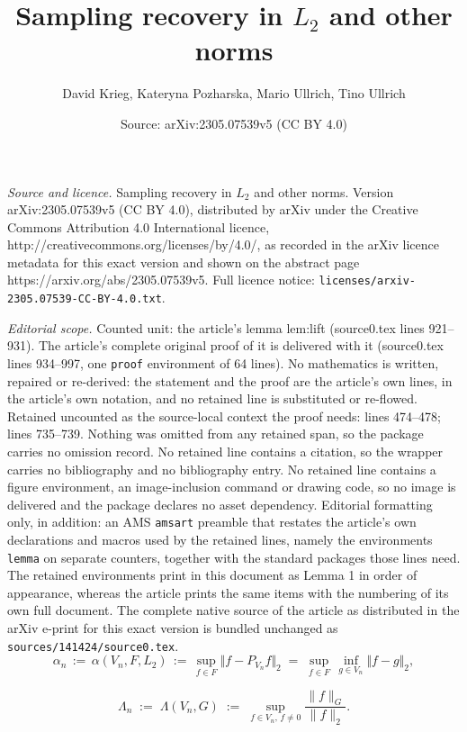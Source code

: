 \documentclass[10pt,a4paper]{amsart}
\title{Sampling recovery in $L_2$ and other norms}
\author{David Krieg, Kateryna Pozharska, Mario Ullrich, Tino Ullrich}
\date{Source: arXiv:2305.07539v5 (CC BY 4.0)}
\begin{document}
\maketitle

\noindent\emph{Source and licence.} Sampling recovery in $L_2$ and other norms. Version arXiv:2305.07539v5 (CC BY 4.0), distributed by arXiv under the Creative Commons Attribution 4.0 International licence, http://creativecommons.org/licenses/by/4.0/, as recorded in the arXiv licence metadata for this exact version and shown on the abstract page https://arxiv.org/abs/2305.07539v5. Full licence notice: \texttt{licenses/arxiv-2305.07539-CC-BY-4.0.txt}.\par\smallskip

\noindent\textit{Editorial scope.} Counted unit: the article's lemma lem:lift (source0.tex lines 921--931). The article's complete original proof of it is delivered with it (source0.tex lines 934--997, one \texttt{proof} environment of 64 lines). No mathematics is written, repaired or re-derived: the statement and the proof are the article's own lines, in the article's own notation, and no retained line is substituted or re-flowed.  Retained uncounted as the source-local context the proof needs: lines 474--478; lines 735--739.  Nothing was omitted from any retained span, so the package carries no omission record.  No retained line contains a citation, so the wrapper carries no bibliography and no bibliography entry.  No retained line contains a figure environment, an image-inclusion command or drawing code, so no image is delivered and the package declares no asset dependency.  Editorial formatting only, in addition: an AMS \texttt{amsart} preamble that restates the article's own declarations and macros used by the retained lines, namely the environments \texttt{lemma} on separate counters, together with the standard packages those lines need.  The retained environments print in this document as Lemma 1 in order of appearance, whereas the article prints the same items with the numbering of its own full document.  The complete native source of the article as distributed in the arXiv e-print for this exact version is bundled unchanged as \texttt{sources/141424/source0.tex}.
\begin{equation}\label{eq:an}
\alpha_n \,:=\, \alpha(V_n,F, L_2
) \,:=\, \sup_{f \in F} \Vert f - P_{V_n} f  \Vert_2
\;=\; \sup_{f \in F}\, \inf_{g\in V_n}\Vert f - g  \Vert_2, 
\end{equation}

\begin{equation}\label{eq:Lambda}
\Lambda_n \;:=\;
\Lambda(V_n,G) \;:=\; 
 \sup\limits_{f \in V_n, \, f\neq 0} \frac{\|f\|_G}{\|f\|_2}.  
\end{equation}
\end{document}
